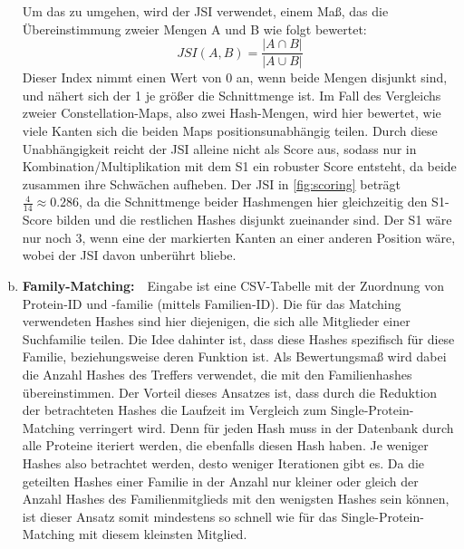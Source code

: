 \begin{enumerate}[a)]
                Um das zu umgehen, wird der \ac{JSI} verwendet, einem Maß, das die Übereinstimmung zweier Mengen A und B wie folgt bewertet:
                \begin{equation}
                    \label{equ:jsi}
                    JSI(A, B)=\frac{|A \cap B|}{|A \cup B|}
                \end{equation}
                Dieser Index nimmt einen Wert von 0 an, wenn beide Mengen disjunkt sind, und nähert sich der 1 je größer die Schnittmenge ist. Im Fall des Vergleichs zweier Constellation-Maps, also zwei Hash-Mengen, wird hier bewertet, wie viele Kanten sich die beiden Maps positionsunabhängig teilen. Durch diese Unabhängigkeit reicht der JSI alleine nicht als Score aus, sodass nur in Kombination/Multiplikation mit dem S1 ein robuster Score entsteht, da beide zusammen ihre Schwächen aufheben. Der \ac{JSI} in \autoref{fig:scoring} beträgt $\frac{4}{14} \approx 0.286$, da die Schnittmenge beider Hashmengen hier gleichzeitig den S1-Score bilden und die restlichen Hashes disjunkt zueinander sind. Der S1 wäre nur noch 3, wenn eine der markierten Kanten an einer anderen Position wäre, wobei der \ac{JSI} davon unberührt bliebe.

            \item {}
                \textbf{Family-Matching:}\ \ Eingabe ist eine \ac{CSV}-Tabelle mit der Zuordnung von Protein-ID und -familie (mittels Familien-ID). Die für das Matching verwendeten Hashes sind hier diejenigen, die sich alle Mitglieder einer Suchfamilie teilen. Die Idee dahinter ist, dass diese Hashes spezifisch für diese Familie, beziehungsweise deren Funktion ist. Als Bewertungsmaß wird dabei die Anzahl Hashes des Treffers verwendet, die mit den Familienhashes übereinstimmen. Der Vorteil dieses Ansatzes ist, dass durch die Reduktion der betrachteten Hashes die Laufzeit im Vergleich zum Single-Protein-Matching verringert wird. Denn für jeden Hash muss in der Datenbank durch alle Proteine iteriert werden, die ebenfalls diesen Hash haben. Je weniger Hashes also betrachtet werden, desto weniger Iterationen gibt es. Da die geteilten Hashes einer Familie in der Anzahl nur kleiner oder gleich der Anzahl Hashes des Familienmitglieds mit den wenigsten Hashes sein können, ist dieser Ansatz somit mindestens so schnell wie für das Single-Protein-Matching mit diesem kleinsten Mitglied.


\end{enumerate}
